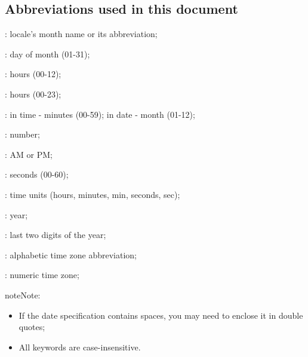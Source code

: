 \documentclass[letterpaper,10pt,english]{sphinxmanual}
\begin{document}
%
\begin{sphinxVerbatim}[commandchars=\\\{\}]
          
  
\end{sphinxVerbatim}


\subsection{Abbreviations used in this document}
\label{\detokenize{basic/date_format:abbreviation}}\label{\detokenize{basic/date_format:abbreviations-used-in-this-document}}
\begin{DUlineblock}{0em}
\item[]   : locale’s month name or its abbreviation;
\item[]    : day of month (01-31);
\item[]    : hours (00-12);
\item[]    : hours (00-23);
\item[]    : in time - minutes (00-59); in date - month (01-12);
\item[]     : number;
\item[]    : AM or PM;
\item[]    : seconds  (00-60);
\item[]    : time units (hours, minutes, min, seconds, sec);
\item[]  : year;
\item[]    : last two digits of the year;
\item[]     : alphabetic time zone abbreviation;
\item[]     : numeric time zone;
\end{DUlineblock}

\begin{sphinxadmonition}{note}{Note:}\begin{itemize}
\item {} 
If the date specification contains spaces, you may need to
enclose it in double quotes;

\item {} 
All keywords are case-insensitive.

\end{itemize}
\end{sphinxadmonition}



\renewcommand{\indexname}{Index}
\printindex
\end{document}
